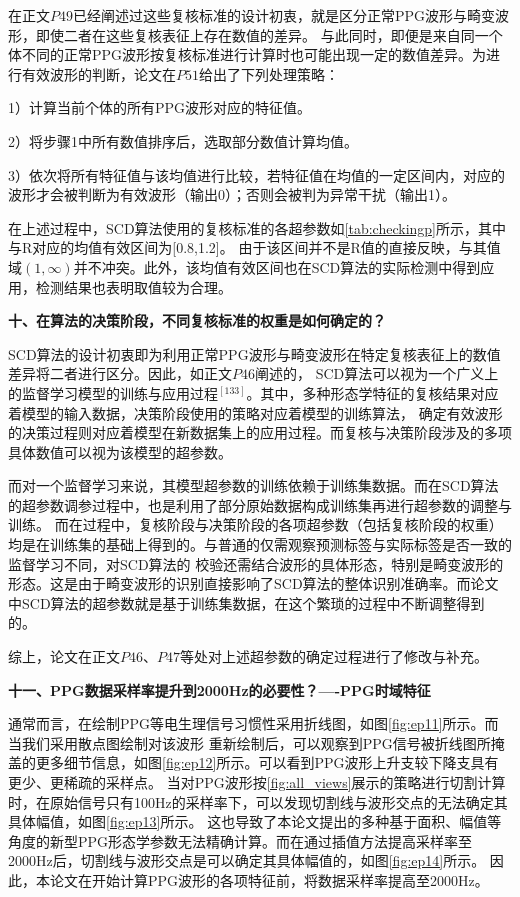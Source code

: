 在正文$P49$已经阐述过这些复核标准的设计初衷，就是区分正常PPG波形与畸变波形，即使二者在这些复核表征上存在数值的差异。
与此同时，即便是来自同一个体不同的正常PPG波形按复核标准进行计算时也可能出现一定的数值差异。为进行有效波形的判断，论文在$P51$给出了下列处理策略：

1）计算当前个体的所有PPG波形对应的特征值。

2）将步骤1中所有数值排序后，选取部分数值计算均值。

3）依次将所有特征值与该均值进行比较，若特征值在均值的一定区间内，对应的波形才会被判断为有效波形（输出0）；否则会被判为异常干扰（输出1）。

在上述过程中，SCD算法使用的复核标准的各超参数如\autoref{tab:checkingp}所示，其中与R对应的均值有效区间为[0.8,1.2]。
由于该区间并不是R值的直接反映，与其值域$(1, \infty)$并不冲突。此外，该均值有效区间也在SCD算法的实际检测中得到应用，检测结果也表明取值较为合理。

\textbf{十、在算法的决策阶段，不同复核标准的权重是如何确定的？}

SCD算法的设计初衷即为利用正常PPG波形与畸变波形在特定复核表征上的数值差异将二者进行区分。因此，如正文$P46$阐述的，
SCD算法可以视为一个广义上的监督学习模型的训练与应用过程$^{[133]}$。其中，多种形态学特征的复核结果对应着模型的输入数据，决策阶段使用的策略对应着模型的训练算法，
确定有效波形的决策过程则对应着模型在新数据集上的应用过程。而复核与决策阶段涉及的多项具体数值可以视为该模型的超参数。

而对一个监督学习来说，其模型超参数的训练依赖于训练集数据。而在SCD算法的超参数调参过程中，也是利用了部分原始数据构成训练集再进行超参数的调整与训练。
而在过程中，复核阶段与决策阶段的各项超参数（包括复核阶段的权重）均是在训练集的基础上得到的。与普通的仅需观察预测标签与实际标签是否一致的监督学习不同，对SCD算法的
校验还需结合波形的具体形态，特别是畸变波形的形态。这是由于畸变波形的识别直接影响了SCD算法的整体识别准确率。而论文中SCD算法的超参数就是基于训练集数据，在这个繁琐的过程中不断调整得到的。

综上，论文在正文$P46$、$P47$等处对上述超参数的确定过程进行了修改与补充。

\textbf{十一、PPG数据采样率提升到2000Hz的必要性？----PPG时域特征}

通常而言，在绘制PPG等电生理信号习惯性采用折线图，如图\autoref{fig:ep11}所示。而当我们采用散点图绘制对该波形
重新绘制后，可以观察到PPG信号被折线图所掩盖的更多细节信息，如图\autoref{fig:ep12}所示。可以看到PPG波形上升支较下降支具有更少、更稀疏的采样点。
当对PPG波形按\autoref{fig:all_views}展示的策略进行切割计算时，在原始信号只有100Hz的采样率下，可以发现切割线与波形交点的无法确定其具体幅值，如图\autoref{fig:ep13}所示。
这也导致了本论文提出的多种基于面积、幅值等角度的新型PPG形态学参数无法精确计算。而在通过插值方法提高采样率至2000Hz后，切割线与波形交点是可以确定其具体幅值的，如图\autoref{fig:ep14}所示。
因此，本论文在开始计算PPG波形的各项特征前，将数据采样率提高至2000Hz。

